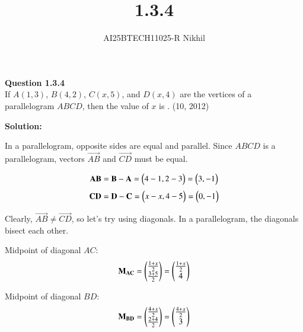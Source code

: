 \documentclass[journal]{IEEEtran}
\begin{document}

\vspace{3cm}

\title{1.3.4}
\author{AI25BTECH11025-R Nikhil}
 \maketitle
{\let\newpage\relax\maketitle}

\renewcommand{\thefigure}{\theenumi}
\renewcommand{\thetable}{\theenumi}
\setlength{\intextsep}{10pt} %


\renewcommand{\thetable}{\theenumi}  
\textbf{Question 1.3.4} \\
If $ A(1, 3) $, $ B(4, 2) $, $ C(x, 5) $, and $ D(x, 4) $ are the vertices of a parallelogram $ABCD$, then the value of $x$ is \underline{\hspace{2cm}}. \hfill (10, 2012)

\vspace{1em}
\textbf{Solution:}

In a parallelogram, opposite sides are equal and parallel. Since $ABCD$ is a parallelogram, vectors $ \vec{AB} $ and $ \vec{CD} $ must be equal.

\begin{align}
\mathbf{AB} = \mathbf{B} -\mathbf{A} = \begin{pmatrix}4 - 1, 2 - 3\end{pmatrix} = \begin{pmatrix}3, -1\end{pmatrix}
\end{align}
\begin{align}
\mathbf{CD} = \mathbf{D} - \mathbf{C} = \begin{pmatrix}x - x, 4 - 5\end{pmatrix} = \begin{pmatrix}0, -1\end{pmatrix}
\end{align}

Clearly, $ \vec{AB} \neq \vec{CD} $, so let's try using diagonals. In a parallelogram, the diagonals bisect each other.

Midpoint of diagonal $AC$:
\begin{align}
\Vec{M_{AC}} = \myvec{\frac{1 + x}{2} \\ \frac{3 + 5}{2} } = \myvec{ \frac{1 + x}{2}\\ 4 }
\end{align}

Midpoint of diagonal $BD$:
\begin{align}
\mathbf{M_{BD}} = \begin{pmatrix}\frac{4 + x}{2} \\ \frac{2 + 4}{2} \end{pmatrix} = \begin{pmatrix} \frac{4 + x}{2}\\ 3 \end{pmatrix}
\end{align}
\end{document}
